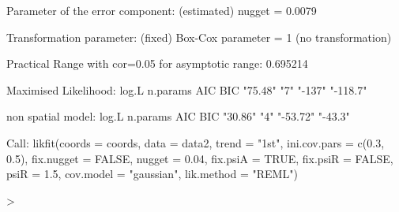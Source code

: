 \documentclass[a4paper]{article}
\begin{document}
\begin{Schunk}
\begin{Soutput}
Parameter of the error component:
      (estimated) nugget =  0.0079

Transformation parameter:
      (fixed) Box-Cox parameter = 1 (no transformation)

Practical Range with cor=0.05 for asymptotic range: 0.695214

Maximised Likelihood:
   log.L n.params      AIC      BIC 
 "75.48"      "7"   "-137" "-118.7" 

non spatial model:
   log.L n.params      AIC      BIC 
 "30.86"      "4" "-53.72"  "-43.3" 

Call:
likfit(coords = coords, data = data2, trend = "1st", ini.cov.pars = c(0.3, 
    0.5), fix.nugget = FALSE, nugget = 0.04, fix.psiA = TRUE, 
    fix.psiR = FALSE, psiR = 1.5, cov.model = "gaussian", lik.method = "REML")
\end{Soutput}
\begin{Sinput}
> 
\end{Sinput}
\end{Schunk}
\end{document}
